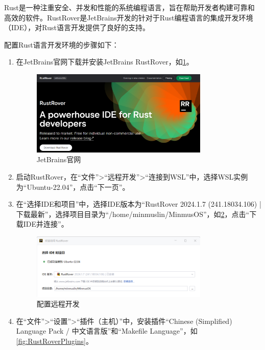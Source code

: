 Rust是一种注重安全、并发和性能的系统编程语言，旨在帮助开发者构建可靠和高效的软件。RustRover是JetBrains开发的针对于Rust编程语言的集成开发环境（IDE），对Rust语言开发提供了良好的支持。

配置Rust语言开发环境的步骤如下：

\begin{enumerate}
    \item 在JetBrains官网下载并安装JetBrains RustRover，如\cref{fig:RustRoverWebsite}。
          \begin{figure}[htbp]
              \centering
              \includegraphics[width=0.8\textwidth]{figures/RustRoverWebsite.png}
              \caption{JetBrains官网}
              \label{fig:RustRoverWebsite}
          \end{figure}
    \item 启动RustRover，在“文件”>“远程开发”>“连接到WSL”中，选择WSL实例为“Ubuntu-22.04”，点击“下一页”。
    \item 在“选择IDE和项目”中，选择IDE版本为“RustRover 2024.1.7 (241.18034.106) | 下载最新”，选择项目目录为“/home/minmuslin/MinmusOS”，如\cref{fig:ConfigureRemoteDevelopment}，点击“下载IDE并连接”。
          \begin{figure}[htbp]
              \centering
              \includegraphics[width=0.8\textwidth]{figures/ConfigureRemoteDevelopment.png}
              \caption{配置远程开发}
              \label{fig:ConfigureRemoteDevelopment}
          \end{figure}
    \item 在“文件”>“设置”>“插件（主机）”中，安装插件“Chinese (Simplified) Language Pack / 中文语言版”和“Makefile Language”，如\cref{fig:RustRoverPlugins}。

\end{enumerate}
